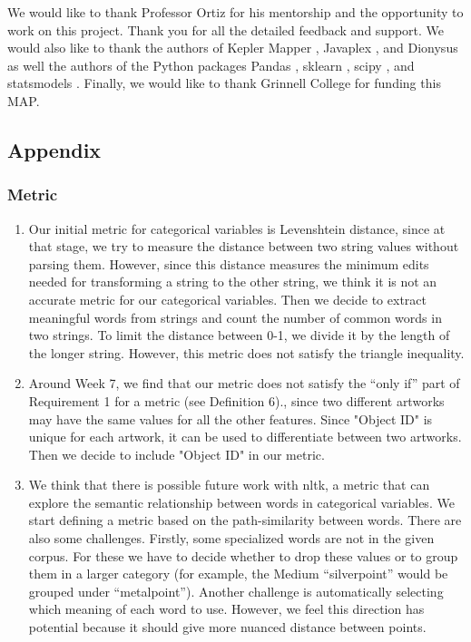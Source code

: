 \documentclass[12pt]{article}
\theoremstyle{definition}
\begin{document}
We would like to thank Professor Ortiz for his mentorship and the opportunity to work on this project. Thank you for all the detailed feedback and support. We would also like to thank the authors of Kepler Mapper \cite{keppler-mapper}, Javaplex \cite{Javaplex}, and Dionysus \cite{Dionysus} as well the authors of the Python packages Pandas \cite{pandas} , sklearn \cite{scikit-learn}, scipy \cite{scipy}, and statsmodels \cite{StatsModels}. Finally, we would like to thank Grinnell College for funding this MAP. 

\subsection{Appendix}
\subsubsection{Metric}
\begin{enumerate}
\item Our initial metric for categorical variables is Levenshtein distance\cite{lev_1966_distance}, since at that stage, we try to measure the distance between two string values without parsing them. However, since this distance measures the minimum edits needed for transforming a string to the other string, we think it is not an accurate metric for our categorical variables. Then we decide to extract meaningful words from strings and count the number of common words in two strings. To limit the distance between 0-1, we divide it by the length of the longer string. However, this metric does not satisfy the triangle inequality.

\item Around Week 7, we find that our metric does not satisfy the ``only if'' part of Requirement 1 for a metric (see Definition 6)., since two different artworks may have the same values for all the other features. Since "Object ID" is unique for each artwork, it can be used to differentiate between two artworks. Then we decide to include "Object ID" in our metric. 

\item We think that there is possible future work with nltk, a metric that can explore the semantic relationship between words in categorical variables. We start defining a metric based on the path-similarity between words. There are also some challenges. Firstly, some specialized words are not in the given corpus. For these we have to decide whether to drop these values or to group them in a larger category (for example, the Medium ``silverpoint'' would be grouped under ``metalpoint''). Another challenge is automatically selecting which meaning of each word to use. However, we feel this direction has potential because it should give more nuanced distance between points.
\end{enumerate}
\end{document}
